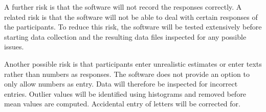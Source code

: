 \documentclass[a4paper,doc,natbib]{apa6}
\begin{document}
    A further risk is that the software will not record the responses correctly. A related risk is that the software will not be able to deal with certain responses of the participants. To reduce this risk, the software will be tested extensively before starting data collection and the resulting data files inspected for any possible issues.

    Another possible risk is that participants enter unrealistic estimates or enter texts rather than numbers as responses. The software does not provide an option to only allow numbers as entry. Data will therefore be inspected for incorrect entries. Outlier values will be identified using histograms and removed before mean values are computed. Accidental entry of letters will be corrected for.


    
\end{document}
